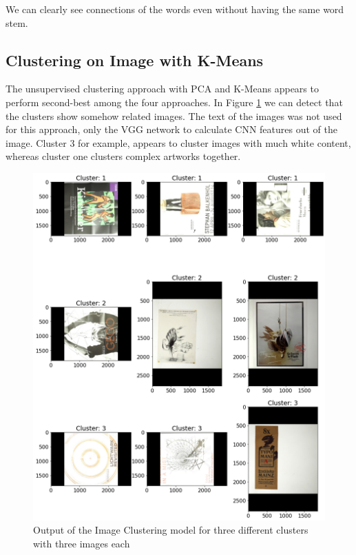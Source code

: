 \documentclass[conference]{IEEEtran}
\begin{document}
We can clearly see connections of the words even without having the same word stem. 

\subsection{Clustering on Image with K-Means}

The unsupervised clustering approach with PCA and K-Means appears to perform second-best among the four approaches. In Figure \ref{fig:kmeans_example} we can detect that the clusters show somehow related images. The text of the images was not used for this approach, only the VGG network to calculate CNN features out of the image. Cluster 3 for example, appears to cluster images with much white content, whereas cluster one clusters complex artworks together.

\begin{figure}
\centering
\includegraphics[width=1\linewidth]{../Imgs/image_clustering_example}
\caption{Output of the Image Clustering model for three different clusters with three images each}
\label{fig:kmeans_example}
\end{figure}
\end{document}
